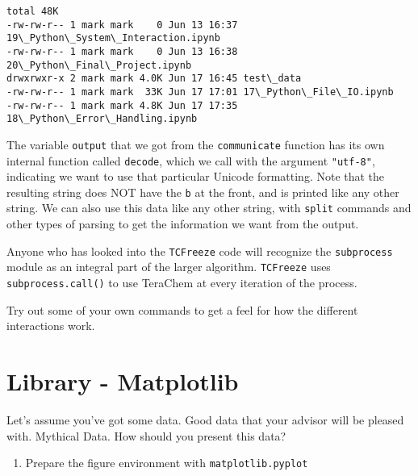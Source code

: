    \begin{Verbatim}[commandchars=\\\{\}]
total 48K
-rw-rw-r-- 1 mark mark    0 Jun 13 16:37 19\_Python\_System\_Interaction.ipynb
-rw-rw-r-- 1 mark mark    0 Jun 13 16:38 20\_Python\_Final\_Project.ipynb
drwxrwxr-x 2 mark mark 4.0K Jun 17 16:45 test\_data
-rw-rw-r-- 1 mark mark  33K Jun 17 17:01 17\_Python\_File\_IO.ipynb
-rw-rw-r-- 1 mark mark 4.8K Jun 17 17:35 18\_Python\_Error\_Handling.ipynb

    \end{Verbatim}

    The variable \texttt{output} that we got from the \texttt{communicate}
function has its own internal function called \texttt{decode}, which we
call with the argument \texttt{"utf-8"}, indicating we want to use that
particular Unicode formatting. Note that the resulting string does NOT
have the \texttt{b} at the front, and is printed like any other string.
We can also use this data like any other string, with \texttt{split}
commands and other types of parsing to get the information we want from
the output.

Anyone who has looked into the \texttt{TCFreeze} code will recognize the
\texttt{subprocess} module as an integral part of the larger algorithm.
\texttt{TCFreeze} uses \texttt{subprocess.call()} to use TeraChem at
every iteration of the process.

Try out some of your own commands to get a feel for how the different
interactions work.
\section{Library - Matplotlib}
Let's assume you've got some data. Good data that your advisor will be
pleased with. Mythical Data. How should you present this data?

\begin{enumerate}
\def\labelenumi{\arabic{enumi}.}
\tightlist
\item
  Prepare the figure environment with \texttt{matplotlib.pyplot}
\end{enumerate}


